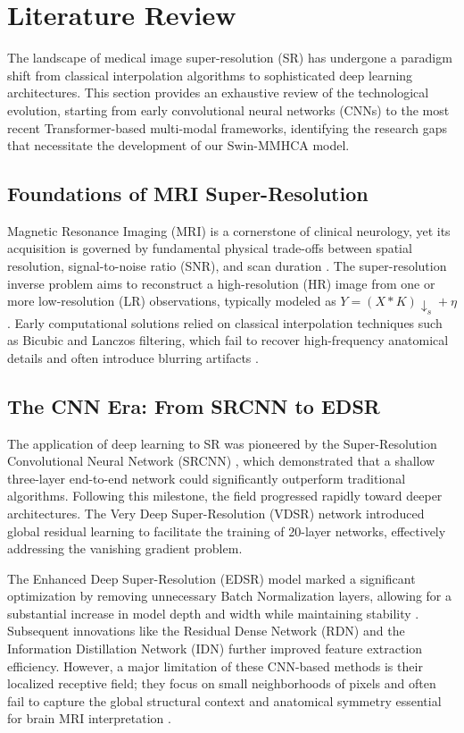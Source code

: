 \section{Literature Review}
The landscape of medical image super-resolution (SR) has undergone a paradigm shift from classical interpolation algorithms to sophisticated deep learning architectures. This section provides an exhaustive review of the technological evolution, starting from early convolutional neural networks (CNNs) to the most recent Transformer-based multi-modal frameworks, identifying the research gaps that necessitate the development of our Swin-MMHCA model.

\subsection{Foundations of MRI Super-Resolution}
Magnetic Resonance Imaging (MRI) is a cornerstone of clinical neurology, yet its acquisition is governed by fundamental physical trade-offs between spatial resolution, signal-to-noise ratio (SNR), and scan duration \cite{ixi_dataset, med_sr_survey}. The super-resolution inverse problem aims to reconstruct a high-resolution (HR) image from one or more low-resolution (LR) observations, typically modeled as $Y = (X \ast K) \downarrow_s + \eta$ \cite{srcnn, tpami_survey}. Early computational solutions relied on classical interpolation techniques such as Bicubic and Lanczos filtering, which fail to recover high-frequency anatomical details and often introduce blurring artifacts \cite{vdsr}.

\subsection{The CNN Era: From SRCNN to EDSR}
The application of deep learning to SR was pioneered by the Super-Resolution Convolutional Neural Network (SRCNN) \cite{srcnn}, which demonstrated that a shallow three-layer end-to-end network could significantly outperform traditional algorithms. Following this milestone, the field progressed rapidly toward deeper architectures. The Very Deep Super-Resolution (VDSR) network \cite{vdsr} introduced global residual learning to facilitate the training of 20-layer networks, effectively addressing the vanishing gradient problem. 

The Enhanced Deep Super-Resolution (EDSR) model \cite{edsr} marked a significant optimization by removing unnecessary Batch Normalization layers, allowing for a substantial increase in model depth and width while maintaining stability \cite{rcan}. Subsequent innovations like the Residual Dense Network (RDN) \cite{rdn} and the Information Distillation Network (IDN) \cite{idn} further improved feature extraction efficiency. However, a major limitation of these CNN-based methods is their localized receptive field; they focus on small neighborhoods of pixels and often fail to capture the global structural context and anatomical symmetry essential for brain MRI interpretation \cite{seran, csn}.

